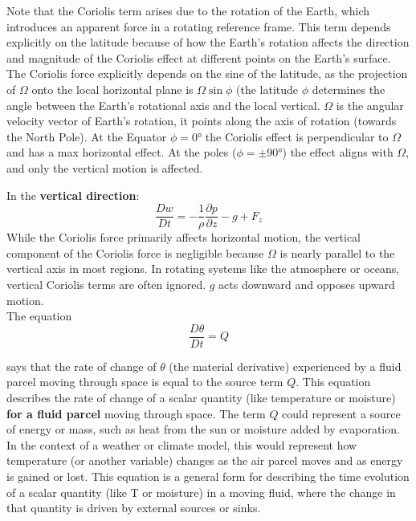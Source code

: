 Note that the Coriolis term arises due to the rotation of the Earth, which introduces an apparent force in a rotating reference frame. This term depends explicitly on the latitude because of how the Earth's rotation affects the direction and magnitude of the Coriolis effect at different points on the Earth's surface. The Coriolis force explicitly depends on the sine of the latitude, as the projection of $\Omega$ onto the local horizontal plane is $\Omega\sin\phi$ (the latitude $\phi$ determines the angle between the Earth's rotational axis and the local vertical. $\Omega$ is the angular velocity vector of Earth's rotation, it points along the axis of rotation (towards the North Pole). At the Equator $\phi=0°$ the Coriolis effect is perpendicular to $\Omega$ and has a max horizontal effect. At the poles ($\phi=\pm 90°$) the effect aligns with $\Omega$, and only the vertical motion is affected.

In the \textbf{vertical direction}:
\begin{equation}
	\frac{Dw}{Dt}=-\frac{1}{\rho}\frac{\partial p}{\partial z}-g+F_z
\end{equation}
While the Coriolis force primarily affects horizontal motion, the vertical component of the Coriolis force is negligible because $\Omega$ is nearly parallel to the vertical axis in most regions. In rotating systems like the atmosphere or oceans, vertical Coriolis terms are often ignored. $g$ acts downward and opposes upward motion.
\\


The equation
\begin{equation}
	\frac{D\theta}{Dt}=Q
\end{equation}

says that the rate of change of $\theta$ (the material derivative) experienced by a fluid parcel moving through space is equal to the source term $Q$. This equation describes the rate of change of a scalar quantity (like temperature or moisture) \textbf{for a fluid parcel} moving through space. The term $Q$ could represent a source of energy or mass, such as heat from the sun or moisture added by evaporation. In the context of a weather or climate model, this would represent how temperature (or another variable) changes as the air parcel moves and as energy is gained or lost.
This equation is a general form for describing the time evolution of a scalar quantity (like T or moisture) in a moving fluid, where the change in that quantity is driven by external sources or sinks.
\\




